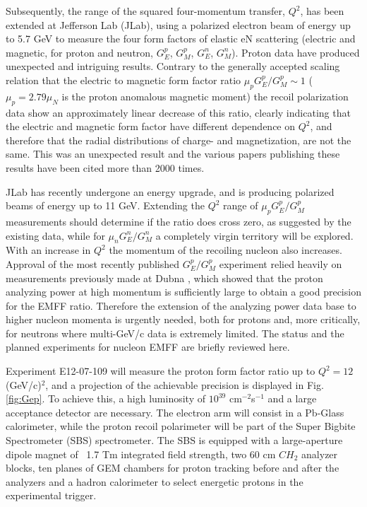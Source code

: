 \documentclass[epj]{svjour}
\begin{document}
Subsequently, the range of the squared four-momentum transfer, $Q^2$, has been extended at Jefferson Lab (JLab), using a polarized electron beam of energy up to 5.7 GeV to measure the four form factors of elastic eN scattering (electric and magnetic, for proton and neutron, $G^p_E$, $G^p_M$, $G^n_E$, $G^n_M$). Proton data have produced unexpected and intriguing results.  Contrary to the generally accepted scaling relation that the electric to magnetic form factor ratio $\mu_p G^p_E/G^p_M \sim 1$ ($\mu_p=2.79\!\mu_N$ is the proton anomalous magnetic moment) the recoil polarization data show an approximately linear decrease of this ratio,  clearly indicating that the electric and magnetic form factor have different dependence on $Q^2$, and therefore that the radial 
distributions of charge- and magnetization, are not the same.  This was an unexpected 
result and the various papers publishing these results 
\cite{Jones:1999rz,Punjabi:2005wq,Gayou:2001qd,Puckett:2011xg,Puckett:2010ac,Puckett:2017flj,Meziane:2010xc} have been cited more than 2000 times. 

JLab has recently undergone an energy upgrade, and is producing polarized beams of energy up to 11 GeV. Extending the $Q^2$ range of  $\mu_p G^p_{E}/G^p_{M}$ measurements should determine if the ratio does cross zero, as suggested by the existing data, while for $\mu_n G^n_{E}/G^n_{M}$ a completely virgin territory will be explored. With an increase in $Q^2$  the momentum of the recoiling nucleon also increases. Approval of the most recently published $G^p_E/G^p_M$ experiment \cite{Puckett:2017flj} relied heavily on measurements previously made at Dubna \cite{Azhgirey:2004yk}, which showed that the proton analyzing power at high momentum is sufficiently large to obtain a good precision for the EMFF ratio. Therefore the extension of the analyzing power data base to higher nucleon momenta is urgently needed, both for protons and, more critically, for neutrons where multi-GeV/c data is extremely limited. The status and the planned experiments for nucleon EMFF
are briefly reviewed here.

Experiment E12-07-109 \cite{PR12-07-109} will measure the proton form factor ratio up to $Q^2 = 12$~  (GeV/c)$^2$, and a projection of the achievable precision is displayed in Fig. \ref{fig:Gep}. To achieve this,  a high luminosity of $10^{39}$ cm$^{-2}$s$^{-1}$ and a large acceptance detector are necessary. The electron arm will consist in a Pb-Glass calorimeter, while the proton recoil polarimeter will be part of the  Super Bigbite Spectrometer (SBS) spectrometer. The SBS is equipped with a large-aperture dipole magnet of ~1.7 Tm integrated field strength, two 60 cm $CH_2$ analyzer blocks, ten planes of GEM chambers for proton tracking before and after the analyzers and a hadron calorimeter to select energetic protons in the experimental trigger. 
\end{document}
